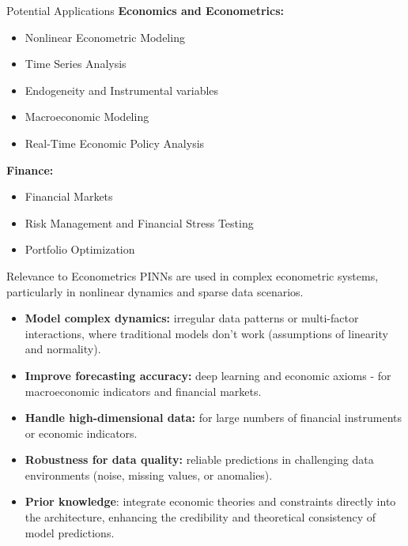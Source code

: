 \begin{frame}{Potential Applications}
\textbf{Economics and Econometrics:}
\begin{itemize}
    \item Nonlinear Econometric Modeling
    \item Time Series Analysis
    \item Endogeneity and Instrumental variables
    \item Macroeconomic Modeling
    \item Real-Time Economic Policy Analysis
\end{itemize}
\textbf{Finance:}
\begin{itemize}
    \item Financial Markets
    \item Risk Management and Financial Stress Testing
    \item Portfolio Optimization
\end{itemize}
\end{frame}

\begin{frame}{Relevance to Econometrics}  
PINNs are used in complex econometric systems, particularly in nonlinear dynamics and sparse data scenarios.
\begin{itemize}
    \item \textbf{Model complex dynamics:} irregular data patterns or multi-factor interactions, where traditional models don't work (assumptions of linearity and normality).
    \item \textbf{Improve forecasting accuracy:} deep learning and economic axioms - for macroeconomic indicators and financial markets. 
    \item \textbf{Handle high-dimensional data:} for large numbers of financial instruments or economic indicators. 
    \item \textbf{Robustness for data quality:} reliable predictions in challenging data environments (noise, missing values, or anomalies). 
    \item \textbf{Prior knowledge}: integrate economic theories and constraints directly into the architecture, enhancing the credibility and theoretical consistency of model predictions.
\end{itemize} 
\end{frame}


